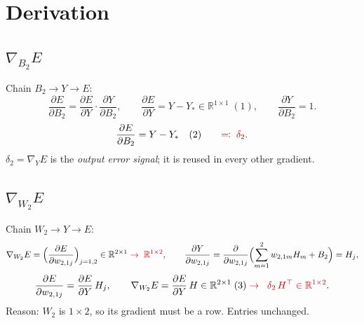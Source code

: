 \documentclass[11pt,a4paper]{article}
\newcommand{\R}{\mathbb{R}}
\newcommand{\C}[1]{{\color{chg}#1}}          %
\newcommand{\fix}[2]{#1\;\C{\to\;#2}}         %
\begin{document}
\section{Derivation}

\subsection{$\nabla_{B_2}E$}
Chain $B_2\to Y\to E$:
\[
\frac{\partial E}{\partial B_2}=\frac{\partial E}{\partial Y}\cdot\frac{\partial Y}{\partial B_2},\qquad
\frac{\partial E}{\partial Y}=Y-Y_*\in\R^{1\times1}\;(1),\qquad
\frac{\partial Y}{\partial B_2}=1 .
\]
\[
\frac{\partial E}{\partial B_2}=Y-Y_*\quad(2)\qquad \C{\eqqcolon\;\delta_2 .}
\]
\C{$\delta_2=\nabla_YE$ is the \emph{output error signal}; it is reused in every other gradient.}

\subsection{$\nabla_{W_2}E$}
Chain $W_2\to Y\to E$:
\[
\nabla_{W_2}E=\Bigl(\frac{\partial E}{\partial w_{2,1j}}\Bigr)_{j=1,2}\in\fix{\R^{2\times1}}{\R^{1\times2}},
\qquad
\frac{\partial Y}{\partial w_{2,1j}}=\frac{\partial}{\partial w_{2,1j}}\Bigl(\sum_{m=1}^{2}w_{2,1m}H_m+B_2\Bigr)=H_j,
\]
\[
\frac{\partial E}{\partial w_{2,1j}}=\frac{\partial E}{\partial Y}\,H_j,
\qquad
\nabla_{W_2}E=\fix{\frac{\partial E}{\partial Y}\,H\in\R^{2\times1}\;(3)}{\;\delta_2\,H^{\top}\in\R^{1\times2}} .
\]
\C{Reason: $W_2$ is $1\times2$, so its gradient must be a row. Entries unchanged.}
\end{document}
